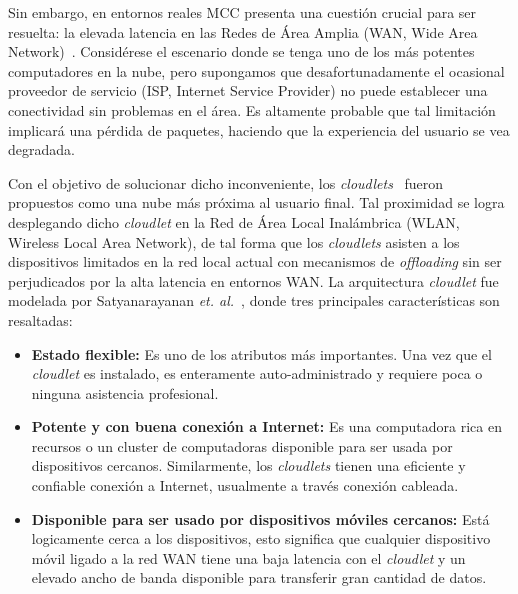 Sin embargo, en entornos reales MCC presenta una cuestión crucial para ser resuelta: la elevada latencia en las Redes de Área Amplia (WAN, 
Wide Area Network)~\cite{5280678}. Considérese el escenario donde se tenga uno de los más potentes computadores en la nube, pero supongamos que
desafortunadamente el ocasional proveedor de servicio (ISP, Internet Service Provider) no puede establecer una conectividad sin problemas en el área. Es altamente
probable que tal limitación implicará una pérdida de paquetes, haciendo que la experiencia del usuario se vea degradada. 

Con el objetivo de solucionar dicho inconveniente, los \textit{cloudlets}~\cite{7026272} fueron propuestos como una  nube más próxima
al 
usuario final. Tal proximidad se logra desplegando dicho \textit{cloudlet} en la Red de Área Local Inalámbrica (WLAN, Wireless Local Area Network),
de tal forma que los \textit{cloudlets} asisten a los dispositivos limitados en la red local actual con mecanismos de \textit{offloading} sin ser
perjudicados por la alta latencia en entornos WAN. La arquitectura \textit{cloudlet} fue modelada por Satyanarayanan {\em et. al.}~\cite{5280678},
donde tres principales características son resaltadas:

\begin{itemize}
 \item \textbf{Estado flexible:} Es uno de los atributos más importantes. Una vez que el \textit{cloudlet} es instalado, es enteramente
 auto-administrado y requiere poca o ninguna asistencia profesional. 
 \item \textbf{Potente y con buena conexión a Internet:} Es una computadora rica en recursos o un cluster de computadoras disponible para ser
 usada por dispositivos cercanos. Similarmente, los \textit{cloudlets} tienen una eficiente y confiable conexión a Internet, usualmente a través
 conexión cableada.
 \item \textbf{Disponible para ser usado por dispositivos móviles cercanos:} Está logicamente cerca a los dispositivos, esto significa que 
 cualquier dispositivo móvil ligado a la red WAN tiene una baja latencia con el \textit{cloudlet} y un elevado ancho de banda disponible para 
 transferir gran cantidad de datos. 
\end{itemize}

